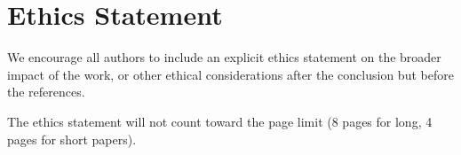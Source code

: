 \section{Ethics Statement}

\textcolor{black!30}{We encourage all authors to include an explicit ethics statement on the broader impact of the work, or other ethical considerations after the conclusion but before the references.} 

\textcolor{black!30}{The ethics statement will not count toward the page limit (8 pages for long, 4 pages for short papers).}